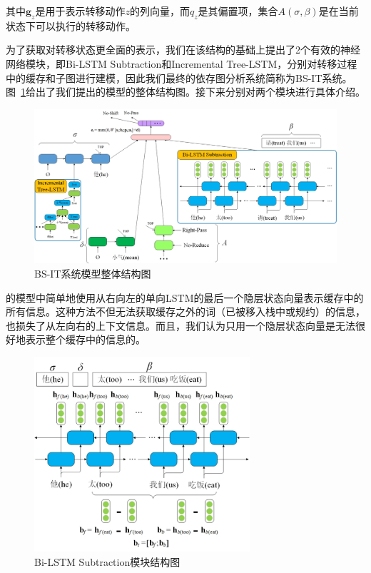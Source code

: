 其中$\mathbf{g}_z$是用于表示转移动作$z$的列向量，而$q_z$是其偏置项，集合$A(\sigma,\beta)$是在当前状态下可以执行的转移动作。

为了获取对转移状态更全面的表示，我们在该结构的基础上提出了2个有效的神经网络模块，即Bi-LSTM Subtraction和Incremental Tree-LSTM，分别对转移过程中的缓存和子图进行建模，因此我们最终的依存图分析系统简称为BS-IT系统。图~\ref{fig:bsit}给出了我们提出的模型的整体结构图。接下来分别对两个模块进行具体介绍。

\begin{figure}[hbtp]
	\centering
	\includegraphics[width=130mm]{picture/bs-it.jpg}
	\caption{BS-IT系统模型整体结构图}
	\label{fig:bsit}
\end{figure}

的模型中简单地使用从右向左的单向LSTM的最后一个隐层状态向量表示缓存中的所有信息。这种方法不但无法获取缓存之外的词（已被移入栈中或规约）的信息，也损失了从左向右的上下文信息。而且，我们认为只用一个隐层状态向量是无法很好地表示整个缓存中的信息的。

\begin{figure}[hbtp]
	\centering
	\includegraphics[width=80mm]{picture/bs.jpg}
	\caption{Bi-LSTM Subtraction模块结构图}
	\label{fig:bs}
\end{figure}

